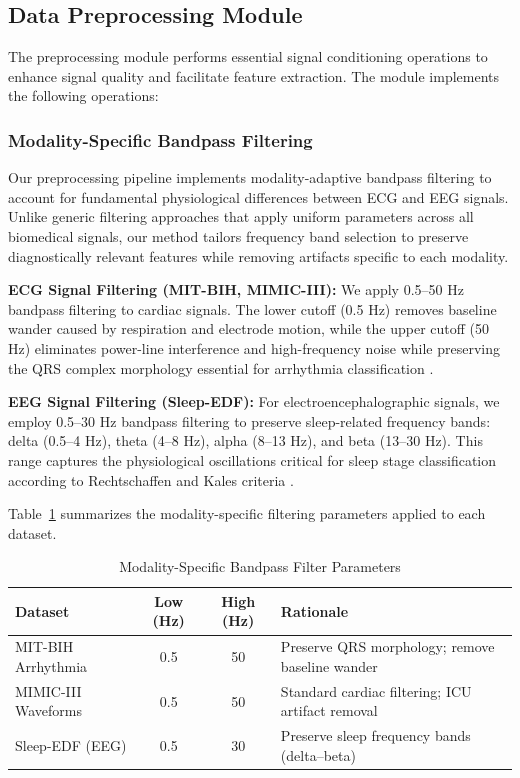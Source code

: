 \documentclass[conference]{IEEEtran}
\begin{document}
\subsection{Data Preprocessing Module}

The preprocessing module performs essential signal conditioning operations to enhance signal quality and facilitate feature extraction. The module implements the following operations:

\subsubsection{Modality-Specific Bandpass Filtering}

Our preprocessing pipeline implements modality-adaptive bandpass filtering to account for fundamental physiological differences between ECG and EEG signals. Unlike generic filtering approaches that apply uniform parameters across all biomedical signals, our method tailors frequency band selection to preserve diagnostically relevant features while removing artifacts specific to each modality.

\textbf{ECG Signal Filtering (MIT-BIH, MIMIC-III):} We apply 0.5--50 Hz bandpass filtering to cardiac signals. The lower cutoff (0.5 Hz) removes baseline wander caused by respiration and electrode motion, while the upper cutoff (50 Hz) eliminates power-line interference and high-frequency noise while preserving the QRS complex morphology essential for arrhythmia classification \cite{pan1985}.

\textbf{EEG Signal Filtering (Sleep-EDF):} For electroencephalographic signals, we employ 0.5--30 Hz bandpass filtering to preserve sleep-related frequency bands: delta (0.5--4 Hz), theta (4--8 Hz), alpha (8--13 Hz), and beta (13--30 Hz). This range captures the physiological oscillations critical for sleep stage classification according to Rechtschaffen and Kales criteria \cite{rechtschaffen1968}.

Table~\ref{tab:filtering_params} summarizes the modality-specific filtering parameters applied to each dataset.

\begin{table}[htbp]
\centering
\caption{Modality-Specific Bandpass Filter Parameters}
\label{tab:filtering_params}
\begin{tabular}{|l|c|c|p{4.5cm}|}
\hline
\textbf{Dataset} & \textbf{Low (Hz)} & \textbf{High (Hz)} & \textbf{Rationale} \\ \hline
MIT-BIH Arrhythmia & 0.5 & 50 & Preserve QRS morphology; remove baseline wander \\ \hline
MIMIC-III Waveforms & 0.5 & 50 & Standard cardiac filtering; ICU artifact removal \\ \hline
Sleep-EDF (EEG) & 0.5 & 30 & Preserve sleep frequency bands (delta--beta) \\ \hline
\end{tabular}
\end{table}
\end{document}
